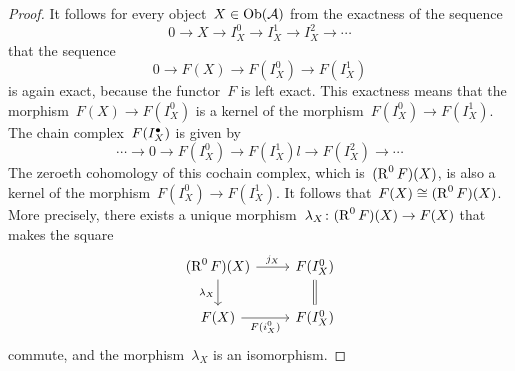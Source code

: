 \begin{proof}
  It follows for every object~$X \in \operatorname{Ob}(\mathcal{A})$ from the exactness of the sequence
  \[
    0
    \to
    X
    \to
    I^0_X
    \to
    I^1_X
    \to
    I^2_X
    \to
    \dotsb
  \]
  that the sequence
  \[
    0
    \to
    F(X)
    \to
    F(I^0_X)
    \to
    F(I^1_X)
  \]
  is again exact, because the functor~$F$ is left exact.
  This exactness means that the morphism~$F(X) \to F(I^0_X)$ is a kernel of the morphism~$F(I^0_X) \to F(I^1_X)$.
  The chain complex~$F(I^\bullet_X)$ is given by
  \[
    \dotsb
    \to
    0
    \to
    F(I^0_X)
    \to
    F(I^1_X)l
    \to
    F(I^2_X)
    \to
    \dotsb
  \]
  The zeroeth cohomology of this cochain complex, which is~$(\operatorname{R}^0 F)(X)$, is also a kernel of the morphism~$F(I^0_X) \to F(I^1_X)$.
  It follows that~$F(X) \cong (\operatorname{R}^0 F)(X)$.
  More precisely, there exists a unique morphism~$\lambda_X \colon (\operatorname{R}^0 F)(X) \to F(X)$ that makes the square
  \[
    \begin{tikzcd}
        (\Right^0 F)(X)
        \arrow{r}[above]{j_X}
        \arrow{d}[left]{\lambda_X}
      & F(I^0_X)
        \arrow[equal]{d}
      \\
        F(X)
        \arrow{r}[below]{F(i^0_X)}
      & F(I^0_X)
    \end{tikzcd}
  \]
  commute, and the morphism~$\lambda_X$ is an isomorphism.
  

\end{proof}
